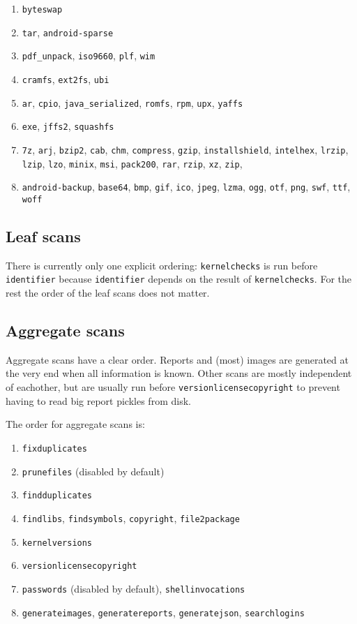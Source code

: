 \documentclass[10pt,a4paper]{article}
\begin{document}
\begin{enumerate}
\item \texttt{byteswap}
\item \texttt{tar}, \texttt{android-sparse}
\item \texttt{pdf\_unpack}, \texttt{iso9660}, \texttt{plf}, \texttt{wim}
\item \texttt{cramfs}, \texttt{ext2fs}, \texttt{ubi}
\item \texttt{ar}, \texttt{cpio}, \texttt{java\_serialized}, \texttt{romfs},
\texttt{rpm}, \texttt{upx}, \texttt{yaffs}
\item \texttt{exe}, \texttt{jffs2}, \texttt{squashfs}
\item \texttt{7z}, \texttt{arj}, \texttt{bzip2}, \texttt{cab}, \texttt{chm},
\texttt{compress}, \texttt{gzip}, \texttt{installshield}, \texttt{intelhex},
\texttt{lrzip}, \texttt{lzip}, \texttt{lzo}, \texttt{minix}, \texttt{msi},
\texttt{pack200}, \texttt{rar}, \texttt{rzip}, \texttt{xz}, \texttt{zip},
\item \texttt{android-backup}, \texttt{base64}, \texttt{bmp}, \texttt{gif},
\texttt{ico}, \texttt{jpeg}, \texttt{lzma}, \texttt{ogg}, \texttt{otf},
\texttt{png}, \texttt{swf}, \texttt{ttf}, \texttt{woff}
\end{enumerate}

\subsection{Leaf scans}

There is currently only one explicit ordering: \texttt{kernelchecks} is run
before \texttt{identifier} because \texttt{identifier} depends on the result
of \texttt{kernelchecks}. For the rest the order of the leaf scans does not
matter.

\subsection{Aggregate scans}

Aggregate scans have a clear order. Reports and (most) images are generated at
the very end when all information is known. Other scans are mostly independent
of eachother, but are usually run before \texttt{versionlicensecopyright} to
prevent having to read big report pickles from disk.

The order for aggregate scans is:

\begin{enumerate}
\item \texttt{fixduplicates}
\item \texttt{prunefiles} (disabled by default)
\item \texttt{findduplicates}
\item \texttt{findlibs}, \texttt{findsymbols}, \texttt{copyright}, \texttt{file2package}
\item \texttt{kernelversions}
\item \texttt{versionlicensecopyright}
\item \texttt{passwords} (disabled by default), \texttt{shellinvocations}
\item \texttt{generateimages}, \texttt{generatereports}, \texttt{generatejson}, \texttt{searchlogins}
\end{enumerate}
\end{document}
